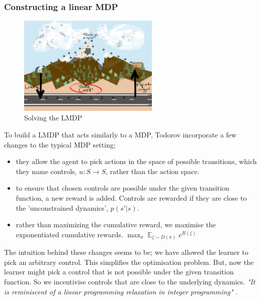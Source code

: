 \subsubsection{Constructing a linear MDP}

\begin{figure}[h!]
  \centering
  \includegraphics[width=0.6\textwidth,height=0.3\textheight]{../../pictures/drawings/abstract-representations-solve.png}
  \caption{Solving the LMDP}
\end{figure}

To build a LMDP that acts similarly to a MDP, Todorov \cite{Todorov2006} incorporate a few changes to the typical MDP setting;

\begin{itemize}
\tightlist
  \item
  they allow the agent to pick actions in the space of possible transitions, which they name controls, $u: S \to S$, rather than the action space.
  \item
  to ensure that chosen controls are possible under the given transition function, a new reward is added.
  Controls are rewarded if they are close to the 'unconstrained dynamics', $p(s' | s)$.
  \item
  rather than maximizing the cumulative reward, we maximise the exponentiated cumulative rewards.
  $\mathop{\text{max}}_{\pi} \mathop{\mathbb E}_{\zeta \sim D(\pi)} e^{R(\zeta)}$ \cite{EricWarrenFox2016}
\end{itemize}

The intuition behind these changes seems to be; we have allowed the learner to pick an arbitrary control.
This simplifies the optimisation problem. But, now the learner might pick a control that is not possible
under the given transition function. So we incentivise controls that are close to the underlying dynamics.
\textit{"It is reminiscent of a linear programming relaxation in integer programming"} \cite{Todorov2009}.

